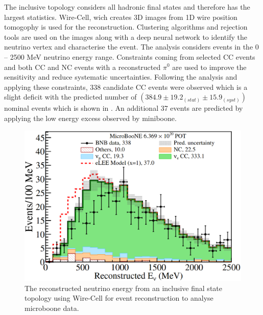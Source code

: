 The inclusive topology considers all hadronic final states and therefore has the largest statistics. Wire-Cell, wich creates 3D images from 1D wire position tomogophy is used for the reconstruction. Clustering algorithms and rejection tools are used on the images along with a deep neural network to identify the neutrino vertex and characterise the event. The analysis considers events in the 0 -- 2500 MeV neutrino energy range. Constraints coming from selected \numu CC events and both CC and NC events with a reconstructed $\pi^0$ are used to improve the sensitivity and reduce systematic uncertainties. Following the \nue analysis and applying these constraints, 338 candidate \nue CC events were observed which is a slight deficit with the predicted number of $(384.9 \pm 19.2_{(stat)} \pm 15.9_{(syst)})$ nominal events which is shown in . An additional 37 events are predicted by applying the low energy excess observed by \gls{miniboone}.

\begin{figure}[h!]
    \centering
    \includegraphics[width = \largefigwidth]{figures-chap2/microboone_inclusive.png}
    \caption[Reconstructed neutrino energy from \gls{microboone} data using an inclusive final state topology for a \nue analysis.]{The reconstructed neutrino energy from an inclusive final state topology using Wire-Cell for event reconstruction to analyse \gls{microboone} data\cite{Search_for_an_Excess_of_Electron_Neutrino_Interactions_in_MicroBooNE_Using_Multiple_Final_State_Topologies}.}
    \label{fig:microboone_inclusive}
\end{figure}


